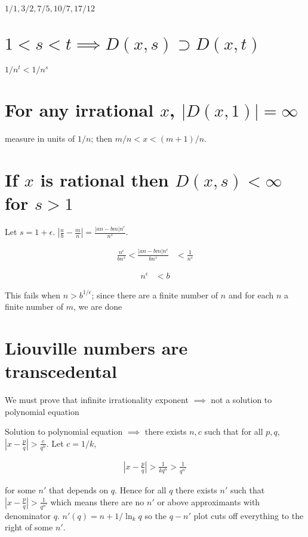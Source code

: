 \documentclass{article}
\begin{document}
$1/1, 3/2, 7/5, 10/7, 17/12$

\section{$1 < s < t \implies D(x,s) \supset D(x,t)$}

$1/n^t < 1/n^s$

\section{For any irrational $x$, $|D(x,1)| = \infty$}

measure in units of $1/n$; then $m/n < x < (m+1)/n$. 

\section{If $x$ is rational then $D(x,s) < \infty$ for $s>1$}

Let $s = 1 + \epsilon$. $|\frac{a}{b} - \frac{m}{n}| = \frac{|an-bm|n^\epsilon}{n^s}$.

\begin{align*}
\frac{n^\epsilon}{bn^s} < \frac{|an-bm|n^\epsilon}{bn^s} &< \frac{1}{n^s}
\end{align*}

\begin{align*}
n^\epsilon &< b
\end{align*}

This fails when $n > b^{1/\epsilon}$; since there are a finite number of $n$ and for each $n$ a finite number of $m$, we are done

\section{Liouville numbers are transcedental}

We must prove that infinite irrationality exponent $\implies$ not a solution to polynomial equation

Solution to polynomial equation $\implies$ there exists $n, c$ such that for all $p,q$, $|x - \frac{p}{q}| > \frac{c}{q^n}$. Let $c = 1/k$, 

\begin{align*}
|x - \frac{p}{q}| > \frac{1}{kq^n} > \frac{1}{q^{n'}}
\end{align*}

for some $n'$ that depends on $q$. Hence for all $q$ there exists $n'$ such that $|x - \frac{p}{q}| > \frac{1}{q^{n'}}$ which means there are no $n'$ or above approximants with denominator $q$. $n'(q) = n + 1/\ln_k q$ so the $q-n'$ plot cuts off everything to the right of some $n'$.
\end{document}
